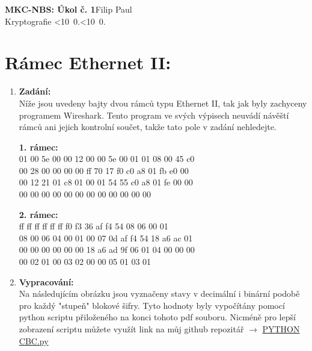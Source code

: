 \documentclass[10pt, a4paper]{article}%
\def\mydate{\leavevmode\hbox{\twodigits\day.\twodigits\month.\the\year}}
\def\twodigits#1{\ifnum#1<10 0\fi\the#1}
\begin{document}
\begin{flushleft}%
	\textbf{\Large{MKC-NBS: Úkol č. 1}}\hfill Filip Paul\\
	\large{Kryptografie \hfill\mydate}
\end{flushleft}
\section*{\large{\textbf{Rámec Ethernet II:}}}
	\begin{enumerate}
		\item \textbf{Zadání:}\\
		Níže jsou uvedeny bajty dvou rámců typu Ethernet II, tak jak byly zachyceny programem 
		Wireshark. Tento program ve svých výpisech neuvádí návěští rámců ani jejich kontrolní součet, 
		takže tato pole v zadání nehledejte.

		\begin{minipage}{0.49\textwidth}
			\textbf{1. rámec:}\\
			01 00 5e 00 00 12 00 00 5e 00 01 01 08 00 45 c0\\
			00 28 00 00 00 00 ff 70 17 f0 c0 a8 01 fb e0 00\\
			00 12 21 01 c8 01 00 01 54 55 c0 a8 01 fe 00 00\\
			00 00 00 00 00 00 00 00 00 00 00 00
			
		\end{minipage}
		\begin{minipage}{0.49\textwidth}
			\textbf{2. rámec:}\\
			ff ff ff ff ff ff f0 f3 36 af f4 54 08 06 00 01 \\
			08 00 06 04 00 01 00 07 0d af f4 54 18 a6 ac 01 \\
			00 00 00 00 00 00 18 a6 ad 9f 06 01 04 00 00 00 \\
			00 02 01 00 03 02 00 00 05 01 03 01
		\end{minipage}



		\item \textbf{Vypracování:}\\
		Na následujícím obrázku jsou vyznačeny stavy v decimální i binární podobě pro každý "stupeň"
		blokové šifry. Tyto hodnoty byly vypočítány pomocí python scriptu přiloženého na konci tohoto pdf souboru.
		Nicméně pro lepší zobrazení scriptu můžete využít link na můj github repozitář $\rightarrow$ 
		\href{https://github.com/FilipPaul/ctvrtak_letni_semestr/blob/main/MKC_NSB/ukol1_kryptografie/README.md}{\color{blue} PYTHON CBC.py}
 	
	\end{enumerate}
\end{document}
